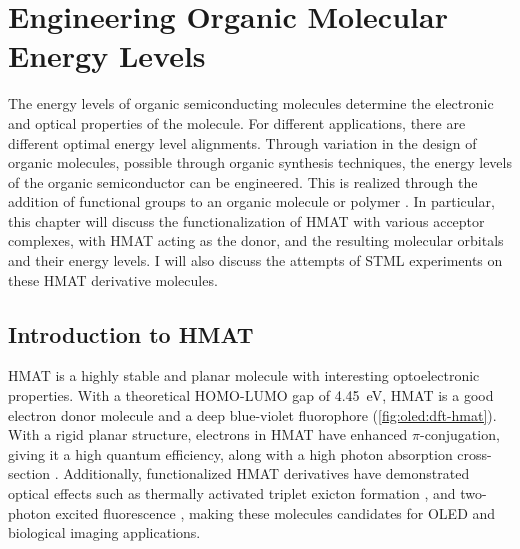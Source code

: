 
\chapter{Engineering Organic Molecular Energy Levels}
\label{ch:oled}


The energy levels of organic semiconducting molecules determine the electronic and optical properties of the molecule. For different applications, there are different optimal energy level alignments. Through variation in the design of organic molecules, possible through organic synthesis techniques, the energy levels of the organic semiconductor can be engineered. This is realized through the addition of functional groups to an organic molecule or polymer \citep{schwarze2016band, VanMullekom2001}. In particular, this chapter will discuss the functionalization of \ac{HMAT} with various acceptor complexes, with \ac{HMAT} acting as the donor, and the resulting molecular orbitals and their energy levels. I will also discuss the attempts of \ac{STML} experiments on these \ac{HMAT} derivative molecules.




\section{Introduction to HMAT}


\Acf{HMAT} is a highly stable and planar molecule with interesting optoelectronic properties. With a theoretical HOMO-LUMO gap of \SI{4.45}{eV}, \ac{HMAT} is a good electron donor molecule and a deep blue-violet fluorophore \cite{Tonge2020} (\autoref{fig:oled:dft-hmat}). With a rigid planar structure, electrons in \ac{HMAT} have enhanced $\pi$-conjugation, giving it a high quantum efficiency, along with a high photon absorption cross-section \citep{Makarov2012}. Additionally, functionalized \ac{HMAT} derivatives have demonstrated optical effects such as thermally activated triplet exicton formation \citep{Chen2017}, and two-photon excited fluorescence \citep{Fang2012,Paisley2020}, making these molecules candidates for \ac{OLED} and biological imaging applications. 

